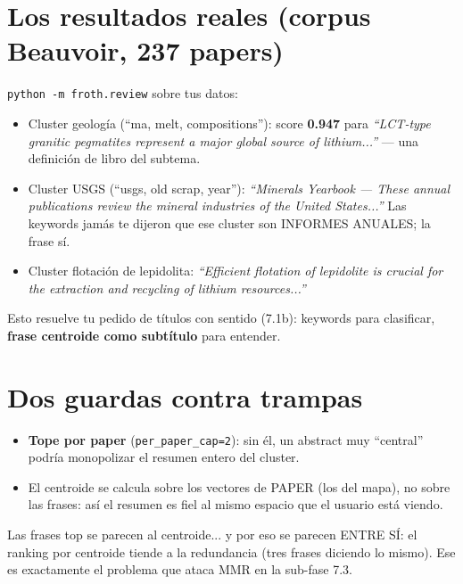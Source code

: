 \documentclass[11pt,a4paper]{article}
\begin{document}
\section{Los resultados reales (corpus Beauvoir, 237 papers)}

\texttt{python -m froth.review} sobre tus datos:

\begin{itemize}
  \item Cluster geología (``ma, melt, compositions''): score \textbf{0.947} para
        \emph{``LCT-type granitic pegmatites represent a major global source of
        lithium...''} --- una definición de libro del subtema.
  \item Cluster USGS (``usgs, old scrap, year''): \emph{``Minerals Yearbook --- These
        annual publications review the mineral industries of the United States...''}
        Las keywords jamás te dijeron que ese cluster son INFORMES ANUALES; la frase sí.
  \item Cluster flotación de lepidolita: \emph{``Efficient flotation of lepidolite is
        crucial for the extraction and recycling of lithium resources...''}
\end{itemize}

Esto resuelve tu pedido de títulos con sentido (7.1b): keywords para clasificar,
\textbf{frase centroide como subtítulo} para entender.

\section{Dos guardas contra trampas}

\begin{itemize}
  \item \textbf{Tope por paper} (\texttt{per\_paper\_cap=2}): sin él, un abstract muy
        ``central'' podría monopolizar el resumen entero del cluster.
  \item El centroide se calcula sobre los vectores de PAPER (los del mapa), no sobre las
        frases: así el resumen es fiel al mismo espacio que el usuario está viendo.
\end{itemize}

\begin{ojo}
Las frases top se parecen al centroide... y por eso se parecen ENTRE SÍ: el ranking por
centroide tiende a la redundancia (tres frases diciendo lo mismo). Ese es exactamente el
problema que ataca MMR en la sub-fase 7.3.
\end{ojo}
\end{document}
